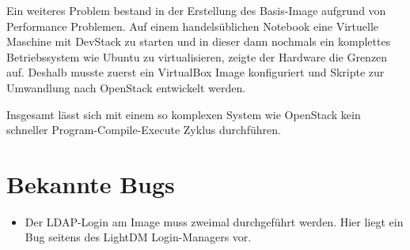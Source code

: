 Ein weiteres Problem bestand in der Erstellung des Basis-Image aufgrund von Performance Problemen.
Auf einem handelsüblichen Notebook eine Virtuelle Maschine mit DevStack zu starten und in dieser dann nochmals ein komplettes Betriebssystem wie Ubuntu zu virtualisieren, zeigte der Hardware die Grenzen auf.
Deshalb musste zuerst ein VirtualBox Image konfiguriert und Skripte zur Umwandlung nach OpenStack entwickelt werden.

Insgesamt lässt sich mit einem so komplexen System wie OpenStack kein schneller Program-Compile-Execute Zyklus durchführen.

\section{Bekannte Bugs}

\begin{itemize}
\item Der LDAP-Login am Image muss zweimal durchgeführt werden. Hier liegt ein Bug seitens des LightDM Login-Managers vor.
\end{itemize}